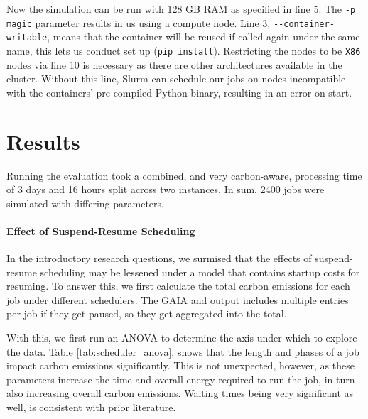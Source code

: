 Now the simulation can be run with 128 GB RAM as specified in line 5. 
The \verb|-p magic| parameter results in us using a compute node. 
Line 3, \verb|--container-writable|, means that the container will be reused if called again under the same name, this lets us conduct set up  (\verb|pip install|).
Restricting the nodes to be \verb|X86| nodes via line 10 is necessary as there are other architectures available in the cluster. 
Without this line, Slurm can schedule our jobs on nodes incompatible with the containers' pre-compiled Python binary, resulting in an error on start.

\section{Results}

Running the evaluation took a combined, and very carbon-aware, processing time of 3 days and 16 hours split across two instances.
In sum, 2400 jobs were simulated with differing parameters. 

\paragraph{Effect of Suspend-Resume Scheduling}

In the introductory research questions, we surmised that the effects of suspend-resume scheduling may be lessened under a model that contains startup costs for resuming. 
To answer this, we first calculate the total carbon emissions for each job under different schedulers. The GAIA and \programname{} output includes multiple entries per job if they get paused, so they get aggregated into the total.

With this, we first run an ANOVA to determine the axis under which to explore the data. Table \ref{tab:scheduler_anova}, shows that the length and phases of a job impact carbon emissions significantly.
This is not unexpected, however, as these parameters increase the time and overall energy required to run the job, in turn also increasing overall carbon emissions.
Waiting times being very significant as well, is consistent with prior literature.\cite{wiesner_lets_2021}

